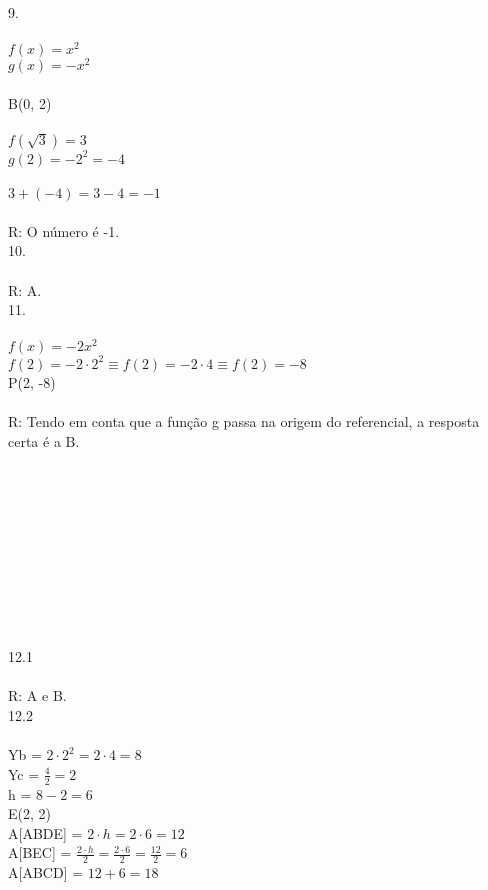 \documentclass[12pt]{article}
\begin{document}
9.\\\\
$f(x)=x^2$\\
$g(x)=-x^2$\\\\
B(0, 2)\\\\
$f(\sqrt{3})=3$\\
$g(2)=-2^2=-4$\\\\
$3+(-4)=3-4=-1$\\\\
R: O número é -1.\\


10.\\\\
R: A.\\

11.\\\\
$f(x)=-2x^2$\\
$f(2)=-2\cdot2^2\equiv f(2)=-2\cdot4\equiv f(2)=-8$\\
P(2, -8)\\\\
R: Tendo em conta que a função g passa na origem do referencial, a resposta certa é a B.\\\\\\\\\\\\\\\\\\\\\\

12.1\\\\
R: A e B.\\

12.2\\\\
Yb = $2\cdot2^2=2\cdot4=8$\\
Yc = $\frac{4}{2}=2$\\
h = $8-2=6$\\
E(2, 2)\\
A[ABDE] = $2\cdot h=2\cdot6=12$\\
A[BEC] = $\frac{2\cdot h}{2}=\frac{2\cdot6}{2}=\frac{12}{2}=6$\\
A[ABCD] = $12+6=18$\\
\end{document}
